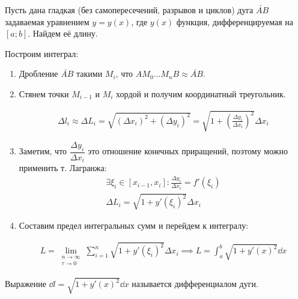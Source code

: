 
Пусть дана гладкая (без самопересечений, разрывов и циклов) дуга \(\breve{AB}\)
задаваемая уравнением \(y = y(x)\), где \(y(x)\) функция, дифференцируемая на
\([a; b]\). Найдем её длину.

Построим интеграл:
\begin{enumerate}
  \item Дробление \(\breve{AB}\) такими \(M_{i}\), что
  \(A M_{0} \dotsc M_{n} B \approx \breve{AB}\).

  \item Стянем точки \(M_{i - 1}\) и \(M_{i}\) хордой и получим координатный
  треугольник.

  \begin{twocolumns}
    \begin{align*}
      \Delta l_{i}
      \approx \Delta L_{i}
      = \sqrt{(\Delta x_{i})^2 + (\Delta y_{i})^2}
      = \sqrt{1 + \left(\frac{\Delta y_{i}}{\Delta x_{i}}\right)^2} \Delta x_{i}
    \end{align*}
    \columnbreak

    
  \end{twocolumns}

  \item Заметим, что \(\dfrac{\Delta y_{i}}{\Delta x_{i}}\) это отношение
  конечных приращений, поэтому можно применить т. Лагранжа:
  \begin{align*}
    \exists \xi_{i} \in [x_{i - 1}, x_{i}] \colon
      \frac{\Delta y_{i}}{\Delta x_{i}} = f'(\xi_{i})
    \\
    \Delta L_{i}
    = \sqrt{1 + y'(\xi_{i})^2} \Delta x_{i}
  \end{align*}
  
  \item Составим предел интегральных сумм и перейдем к интегралу:

  \begin{align*}
    L = \lim_{\substack{n \to \infty \\ \tau \to 0}}
      \sum_{i = 1}^{n} \sqrt{1 + y'(\xi_{i})^2} \Delta x_{i}
    \implies L = \int_{a}^{b} \sqrt{1 + y'(x)^2} \dd x
  \end{align*}
\end{enumerate}

\begin{remark}\label{arc-diff}
  Выражение \(\dd l = \sqrt{1 + y'(x)^2} \dd x\) называется дифференциалом дуги.
\end{remark}